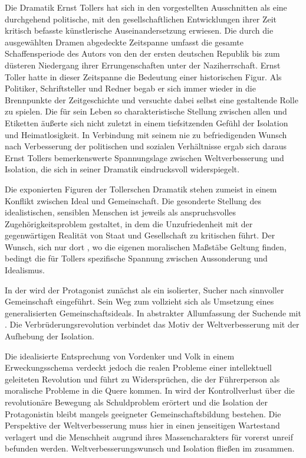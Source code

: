 
Die Dramatik Ernst Tollers hat sich in den vorgestellten Ausschnitten als eine
durchgehend politische, mit den gesellschaftlichen Entwicklungen ihrer Zeit
kritisch befasste künstlerische Auseinandersetzung erwiesen. Die durch die
ausgewählten Dramen abgedeckte Zeitspanne umfasst die gesamte Schaffensperiode
des Autors von den  der ersten deutschen Republik bis zum
düsteren Niedergang ihrer Errungenschaften unter der Naziherrschaft. Ernst
Toller hatte in dieser Zeitspanne die Bedeutung einer historischen Figur. Als
Politiker, Schriftsteller und Redner begab er sich immer wieder in die
Brennpunkte der Zeitgeschichte und versuchte dabei selbst eine gestaltende
Rolle zu spielen. Die für sein Leben so charakteristische Stellung zwischen
allen  und Etiketten äußerte sich nicht zuletzt in einem
tiefsitzenden Gefühl der Isolation und Heimatlosigkeit. In Verbindung mit
seinem nie zu befriedigenden Wunsch nach Verbesserung der politischen und
sozialen Verhältnisse  ergab sich daraus Ernst Tollers
bemerkenswerte Spannungslage zwischen Weltverbesserung und Isolation, die sich
in seiner Dramatik eindrucksvoll widerspiegelt.

Die exponierten Figuren der Tollerschen Dramatik stehen zumeist in einem
Konflikt zwischen Ideal und Gemeinschaft. Die gesonderte Stellung des
idealistischen, sensiblen Menschen ist jeweils als anspruchsvolles
Zugehörigkeitsproblem  gestaltet, in dem die Unzufriedenheit mit der
gegenwärtigen Realität von Staat und Gesellschaft zu kritischen
führt. Der Wunsch, sich nur dort , wo die eigenen
moralischen Maßstäbe Geltung finden, bedingt die für Tollers 
spezifische Spannung zwischen Aussonderung und Idealismus.

In der  wird der Protagonist zunächst als ein isolierter,
 Sucher nach sinnvoller Gemeinschaft eingeführt. Sein Weg
zum  vollzieht sich als Umsetzung eines generalisierten
Gemeinschaftsideals. In abstrakter Allumfassung  der
Suchende mit . Die Verbrüderungsrevolution verbindet
das Motiv der Weltverbesserung mit der Aufhebung der Isolation. 

Die idealisierte Entsprechung von Vordenker und Volk in einem Erweckungsschema  
verdeckt jedoch die realen Probleme einer intellektuell geleiteten Revolution
und führt zu Widersprüchen, die der Führerperson als moralische Probleme
in die Quere kommen. In  wird der Kontrollverlust über die
revolutionäre Bewegung als Schuldproblem erörtert und die Isolation der
Protagonistin bleibt mangels geeigneter Gemeinschaftsbildung bestehen. Die
Perspektive der Weltverbesserung muss hier in einen jenseitigen Wartestand
verlagert und die Menschheit augrund ihres Massencharakters für vorerst unreif
befunden werden. Weltverbesserungswunsch und Isolation fließen im
 zusammen.

